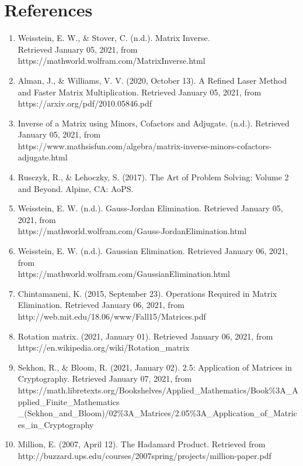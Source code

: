 \documentclass{article}
\begin{document}
\section*{References}
\begin{enumerate}[leftmargin=!,labelindent=5pt,itemindent=-15pt]
    \item Weisstein, E. W., \& Stover, C. (n.d.). Matrix Inverse. \\ Retrieved January 05, 2021, from https://mathworld.wolfram.com/MatrixInverse.html
    \item Alman, J., \& Williams, V. V. (2020, October 13). A Refined Laser Method and Faster Matrix Multiplication. Retrieved January 05, 2021, from https://arxiv.org/pdf/2010.05846.pdf
    \item Inverse of a Matrix using Minors, Cofactors and Adjugate. (n.d.). Retrieved January 05, 2021, from \\ https://www.mathsisfun.com/algebra/matrix-inverse-minors-cofactors-adjugate.html
    \item Rusczyk, R., \& Lehoczky, S. (2017). The Art of Problem Solving: Volume 2 and Beyond. Alpine, CA: AoPS.
    \item Weisstein, E. W. (n.d.). Gauss-Jordan Elimination. Retrieved January 05, 2021, from \\ https://mathworld.wolfram.com/Gauss-JordanElimination.html
    \item Weisstein, E. W. (n.d.). Gaussian Elimination. Retrieved January 06, 2021, from \\ https://mathworld.wolfram.com/GaussianElimination.html
    \item Chintamaneni, K. (2015, September 23). Operations Required in Matrix Elimination. Retrieved January 06, 2021, from http://web.mit.edu/18.06/www/Fall15/Matrices.pdf
    \item Rotation matrix. (2021, January 01). Retrieved January 06, 2021, from https://en.wikipedia.org/wiki/Rotation\_matrix
    \item Sekhon, R., \& Bloom, R. (2021, January 02). 2.5: Application of Matrices in Cryptography. Retrieved January 07, 2021, from\\ https://math.libretexts.org/Bookshelves/Applied\_Mathematics/Book\%3A\_Applied\_Finite\_Mathematics\\\_(Sekhon\_and\_Bloom)/02\%3A\_Matrices/2.05\%3A\_Application\_of\_Matrices\_in\_Cryptography
    \item Million, E. (2007, April 12). The Hadamard Product. Retrieved from       
\\ http://buzzard.ups.edu/courses/2007spring/projects/million-paper.pdf

\end{enumerate}
\end{document}
